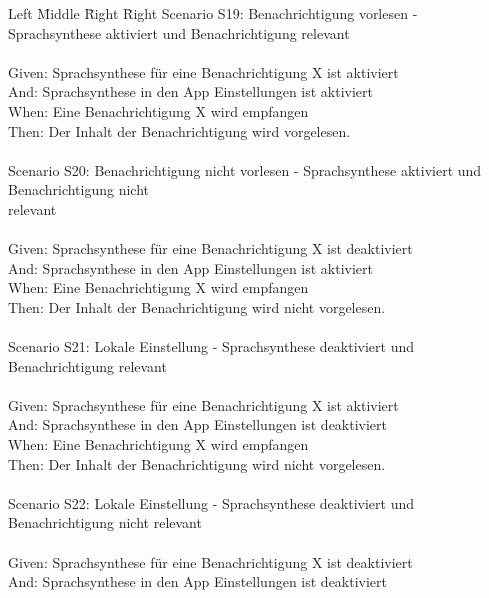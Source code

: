 \begin{tabbing}
    Left \= Middle \= Right \= Right \kill
    Scenario S19: \> \> \> Benachrichtigung vorlesen - Sprachsynthese aktiviert und Benachrichtigung relevant \\ \\
    Given:  \> \> \> Sprachsynthese für eine Benachrichtigung X ist aktiviert \\
    And:  \> \> \> Sprachsynthese in den App Einstellungen ist aktiviert \\
    When:   \> \> \> Eine Benachrichtigung X wird empfangen \\
    Then:   \> \> \> Der Inhalt der Benachrichtigung wird vorgelesen. \\
    \\
    Scenario S20: \> \> \> Benachrichtigung nicht vorlesen - Sprachsynthese aktiviert und Benachrichtigung nicht \\
    \> \> \> relevant \\ \\
    Given:  \> \> \> Sprachsynthese für eine Benachrichtigung X ist deaktiviert \\
    And:  \> \> \> Sprachsynthese in den App Einstellungen ist aktiviert \\
    When:   \> \> \> Eine Benachrichtigung X wird empfangen \\
    Then:   \> \> \> Der Inhalt der Benachrichtigung wird nicht vorgelesen. \\
    \\
    Scenario S21: \> \> \> Lokale Einstellung - Sprachsynthese deaktiviert und Benachrichtigung relevant \\ \\
    Given:  \> \> \> Sprachsynthese für eine Benachrichtigung X ist aktiviert \\
    And:  \> \> \> Sprachsynthese in den App Einstellungen ist deaktiviert \\
    When:   \> \> \> Eine Benachrichtigung X wird empfangen \\
    Then:   \> \> \> Der Inhalt der Benachrichtigung wird nicht vorgelesen. \\
    \\
    Scenario S22: \> \> \> Lokale Einstellung - Sprachsynthese deaktiviert und Benachrichtigung nicht relevant \\ \\
    Given:  \> \> \> Sprachsynthese für eine Benachrichtigung X ist deaktiviert \\
    And:  \> \> \> Sprachsynthese in den App Einstellungen ist deaktiviert \\

\end{tabbing}
